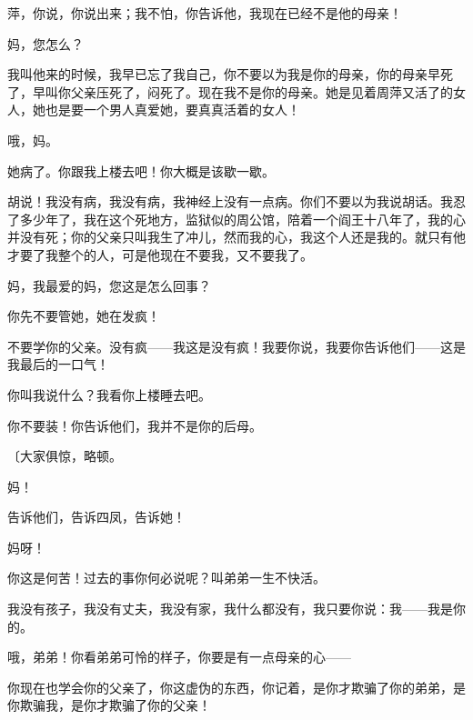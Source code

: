 萍，你说，你说出来；我不怕，你告诉他，我现在已经不是他的母亲！

妈，您怎么？

我叫他来的时候，我早已忘了我自己，你不要以为我是你的母亲，你的母亲早死了，早叫你父亲压死了，闷死了。现在我不是你的母亲。她是见着周萍又活了的女人，她也是要一个男人真爱她，要真真活着的女人！

哦，妈。

她病了。你跟我上楼去吧！你大概是该歇一歇。

胡说！我没有病，我没有病，我神经上没有一点病。你们不要以为我说胡话。我忍了多少年了，我在这个死地方，监狱似的周公馆，陪着一个阎王十八年了，我的心并没有死；你的父亲只叫我生了冲儿，然而我的心，我这个人还是我的。就只有他才要了我整个的人，可是他现在不要我，又不要我了。

妈，我最爱的妈，您这是怎么回事？

你先不要管她，她在发疯！

不要学你的父亲。没有疯——我这是没有疯！我要你说，我要你告诉他们——这是我最后的一口气！

你叫我说什么？我看你上楼睡去吧。

你不要装！你告诉他们，我并不是你的后母。

{\fangsong〔大家俱惊，略顿。}

妈！

告诉他们，告诉四凤，告诉她！

妈呀！

你这是何苦！过去的事你何必说呢？叫弟弟一生不快活。

我没有孩子，我没有丈夫，我没有家，我什么都没有，我只要你说：我——我是你的。

哦，弟弟！你看弟弟可怜的样子，你要是有一点母亲的心——

你现在也学会你的父亲了，你这虚伪的东西，你记着，是你才欺骗了你的弟弟，是你欺骗我，是你才欺骗了你的父亲！

